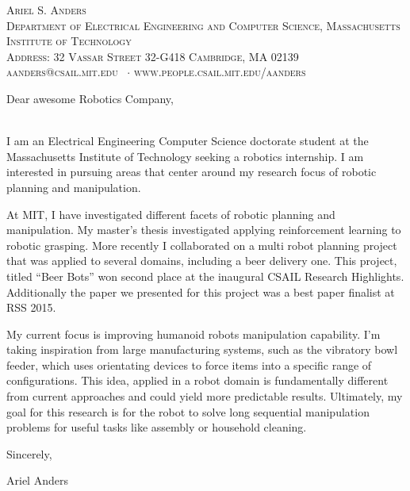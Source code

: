 \documentclass[10pt,letterpaper]{article}
\newcommand{\namestyle}{\Huge \scshape}
\newcommand{\deptstyle}{\footnotesize \rmfamily \scshape}
\newcommand{\addressstyle}{\footnotesize \rmfamily \upshape}
\begin{document}
\iffalse
\begin{center}
\namestyle Ariel S. Anders \\[0.3em]
\deptstyle Department of Electrical Engineering and Computer Science, Massachusetts Institute of Technology \\[0.2em]
\addressstyle Address: 32 Vassar Street 32-G418 Cambridge, MA 02139\\
aanders@csail.mit.edu \ $\cdot$ www.people.csail.mit.edu/aanders
\end{center}


Dear awesome Robotics Company, \\
\\\par
I am an Electrical Engineering Computer Science doctorate student at the Massachusetts Institute of Technology seeking a robotics internship.  I am interested in pursuing areas that center around my research focus of robotic planning and manipulation. \par 
At MIT, I have investigated different facets of robotic planning and manipulation. My master’s thesis investigated applying reinforcement learning to robotic grasping.  More recently I collaborated on a multi robot planning project that was applied to several domains, including a beer delivery one.  This project, titled ``Beer Bots'' won second place at the inaugural CSAIL Research Highlights. Additionally the paper we presented for this project was a best paper finalist at RSS 2015.   \par 

My current focus is improving  humanoid robots manipulation capability.  I'm taking inspiration from large manufacturing  systems, such as the vibratory bowl feeder, which uses orientating devices to force items into a specific range of configurations.  This idea, applied in a robot domain is fundamentally different from current approaches and could yield more predictable results. Ultimately, my goal for this research is for the robot to solve long sequential manipulation problems for useful tasks like assembly or household cleaning.

Sincerely,\\ \par
Ariel Anders
\end{document}
